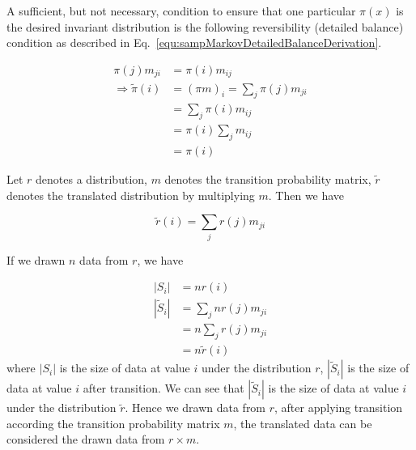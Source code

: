 \documentclass[runningheads,openany]{xhlPaper}
\begin{document}
A sufficient, but not necessary, condition to ensure that one particular $\pi \left(x\right)$ is the desired invariant distribution is the following reversibility (detailed balance) condition as described in Eq.~\ref{equ:sampMarkovDetailedBalanceDerivation}.

\begin{equation}
\label{equ:sampMarkovDetailedBalanceDerivation}
\begin{aligned}
\pi \left( j \right){m_{ji}} &= \pi \left( i \right){m_{ij}}\\
 \Rightarrow \tilde \pi \left( i \right) &= {\left( {\pi m} \right)_i} = \sum\limits_j {\pi \left( j \right){m_{ji}}} \\
 &= \sum\limits_j {\pi \left( i \right){m_{ij}}} \\
 &= \pi \left( i \right)\sum\limits_j {{m_{ij}}} \\
 &= \pi \left( i \right)
\end{aligned}
\end{equation}

Let $r$ denotes a distribution, $m$ denotes the transition probability matrix, ${\tilde r}$ denotes the translated distribution by multiplying $m$. Then we have 
 
\begin{equation}
\label{equ:translated_distribution}
\tilde r\left( i \right) = \sum\limits_j {r\left( j \right){m_{ji}}}
\end{equation}

If we drawn $n$ data from $r$, we have 

\begin{equation}
\label{equ:markov_proof_drawn_data_probability}
\begin{aligned}
|{S_i}| &= nr\left( i \right)\\
|{{\tilde S}_i}| &= \sum\limits_j {nr\left( j \right){m_{ji}}} \\
 &= n\sum\limits_j {r\left( j \right){m_{ji}}} \\
 &= n\tilde r\left( i \right)
\end{aligned}
\end{equation}
where $|{S_i}|$ is the size of data at value $i$ under the distribution $r$, $|{{\tilde S}_i}|$ is the size of data at value $i$ after transition. We can see that $|{{\tilde S}_i}|$ is the size of data at value $i$ under the distribution $\tilde r$.
Hence we drawn data from $r$, after applying transition according the transition probability matrix $m$, the translated data can be considered the drawn data from $r \times m$.
\end{document}
